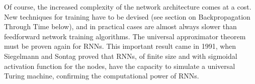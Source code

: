 \documentclass[12pt,oneside]{CUNY_CS_PhD}
\begin{document}
Of course, the increased complexity of the network architecture comes at a cost. New techniques for training
 have to be devised (see section on Backpropagation Through Time below), and in practical cases are almost always slower than feedforward network training algorithms. 
The universal approximator theorem must be proven again for RNNs. This important result came in 1991, when Siegelmann and Sontag \cite{Siegelmann91turingcomputability} proved that RNNs, of finite size and with sigmoidal activation function for the nodes, have the capacity to simulate a universal Turing machine, confirming the computational power of RNNs.
\end{document}
